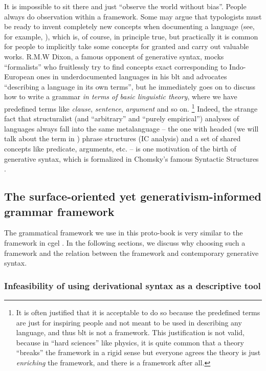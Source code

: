\documentclass[../main.tex]{subfiles}
\begin{document}
It is impossible to sit there and just ``observe the world without bias''. People always do observation within a 
framework. Some may argue that typologists must be ready to invent completely new concepts when documenting 
a language (see, for example, \citet{haspelmath2008framework}), which is, of course, in principle true, 
but practically it is common for people to implicitly take some concepts for granted and carry out 
valuable works. R.M.W Dixon, a famous opponent of generative syntax, mocks ``formalists'' who fruitlessly try 
to find concepts exact corresponding to Indo-European ones in underdocumented languages in his 
\ac{blt} \citep{dixon2009basic} and advocates ``describing a language in its own terms'',
but he immediately goes on to discuss how to write a grammar \emph{in terms of basic linguistic theory},
where we have predefined terms like \emph{clause}, \emph{sentence}, \emph{argument} and so on. %
\footnote{
    It is often justified that it is acceptable to do so because the predefined terms are just for inspiring 
    people and not meant to be used in describing any language, and thus \ac{blt} is not a framework. This justification is not valid, because in 
    ``hard sciences'' like physics, it is quite common that a theory ``breaks'' the framework in a rigid sense 
    but everyone agrees the theory is just \emph{enriching} the framework, and there is a framework after all.
}%
Indeed, the strange fact that structuralist (and ``arbitrary'' and ``purely empirical'') analyses of 
languages always fall into the same metalanguage -- the one with headed (we will talk about the term in 
) phrase structures (IC analysis) and a set of shared concepts like predicate, 
arguments, etc. -- is one motivation of the birth of generative syntax, which is formalized in Chomsky's 
famous Syntactic Structures \citep{chomsky2009syntactic}.

\subsection{The surface-oriented yet generativism-informed grammar framework} 

The grammatical framework we use in this proto-book is very similar to the framework in \ac{cgel} \citep{cgel,pullum2008expressive}. In the following sections, we discuss why choosing such a framework and the relation 
between the framework and contemporary generative syntax.

\subsubsection{Infeasibility of using derivational syntax as a descriptive tool}
\end{document}

